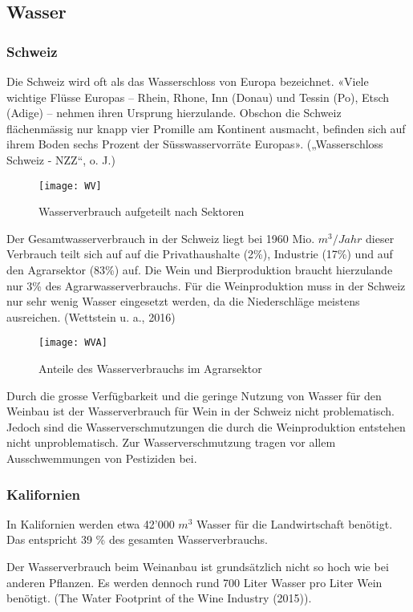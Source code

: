 \subsection{Wasser}

\subsubsection{Schweiz}
Die Schweiz wird oft als das Wasserschloss von Europa bezeichnet. «Viele wichtige Flüsse Europas – Rhein, Rhone, Inn (Donau) und Tessin (Po), Etsch (Adige) – nehmen ihren Ursprung hierzulande. Obschon die Schweiz flächenmässig nur knapp vier Promille am Kontinent ausmacht, befinden sich auf ihrem Boden sechs Prozent der Süsswasservorräte Europas». („Wasserschloss Schweiz - NZZ“, o. J.)
\begin{figure}[H]
	\centering
	\texttt{[image: WV]}
	\caption{Wasserverbrauch aufgeteilt nach Sektoren}
\end{figure}
Der Gesamtwasserverbrauch in der Schweiz liegt bei 1960 Mio. $m^3/Jahr$ dieser Verbrauch teilt sich auf auf die Privathaushalte (2\%), Industrie (17\%) und auf den Agrarsektor (83\%) auf. Die Wein und Bierproduktion braucht hierzulande nur 3\% des Agrarwasserverbrauchs. Für die Weinproduktion muss in der Schweiz nur sehr wenig Wasser eingesetzt werden, da die Niederschläge meistens ausreichen. (Wettstein u. a., 2016)
\begin{figure}[H]
	\centering
	\texttt{[image: WVA]}
	\caption{Anteile des Wasserverbrauchs im       Agrarsektor}
\end{figure}

Durch die grosse Verfügbarkeit und die geringe Nutzung von Wasser für den Weinbau ist der Wasserverbrauch für Wein in der Schweiz nicht problematisch. Jedoch sind die Wasserverschmutzungen die durch die Weinproduktion entstehen nicht unproblematisch. Zur Wasserverschmutzung tragen vor allem Ausschwemmungen von Pestiziden bei.

\subsubsection{Kalifornien}
\label{sub:wasserverbrauch}

In Kalifornien werden etwa 42'000 $m^3$ Wasser für die Landwirtschaft benötigt. Das entspricht  39 \% des gesamten
Wasserverbrauchs. 

Der Wasserverbrauch beim Weinanbau ist grundsätzlich nicht so hoch wie bei anderen Pflanzen. Es
werden dennoch rund 700 Liter Wasser pro Liter Wein benötigt.
(\glqq{}The Water Footprint of the Wine Industry\grqq{} (2015)). 

